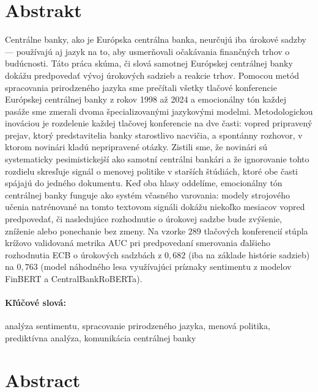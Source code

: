 \newpage 
\section*{Abstrakt}

Centrálne banky, ako je Európska centrálna banka, neurčujú iba úrokové sadzby --- používajú aj jazyk na to, aby usmerňovali očakávania finančných trhov o budúcnosti. Táto práca skúma, či slová samotnej Európskej centrálnej banky dokážu predpovedať vývoj úrokových sadzieb a reakcie trhov. Pomocou metód spracovania prirodzeného jazyka sme prečítali všetky tlačové konferencie Európskej centrálnej banky z rokov 1998 až 2024 a emocionálny tón každej pasáže sme zmerali dvoma špecializovanými jazykovými modelmi. Metodologickou inováciou je rozdelenie každej tlačovej konferencie na dve časti: vopred pripravený prejav, ktorý predstavitelia banky starostlivo nacvičia, a spontánny rozhovor, v ktorom novinári kladú nepripravené otázky. Zistili sme, že novinári sú systematicky pesimistickejší ako samotní centrálni bankári a že ignorovanie tohto rozdielu skresľuje signál o menovej politike v starších štúdiách, ktoré obe časti spájajú do jedného dokumentu. Keď oba hlasy oddelíme, emocionálny tón centrálnej banky funguje ako systém včasného varovania: modely strojového učenia natrénované na tomto textovom signáli dokážu niekoľko mesiacov vopred predpovedať, či nasledujúce rozhodnutie o úrokovej sadzbe bude zvýšenie, zníženie alebo ponechanie bez zmeny. Na vzorke $289$ tlačových konferencií stúpla krížovo validovaná metrika AUC pri predpovedaní smerovania ďalšieho rozhodnutia ECB o úrokových sadzbách z $0,682$ (iba na základe histórie sadzieb) na $0,763$ (model náhodného lesa využívajúci príznaky sentimentu z modelov FinBERT a CentralBankRoBERTa).

\paragraph*{Kľúčové slová:} 
analýza sentimentu, spracovanie prirodzeného jazyka, menová politika, prediktívna analýza, komunikácia centrálnej banky


\newpage 
\section*{Abstract}

